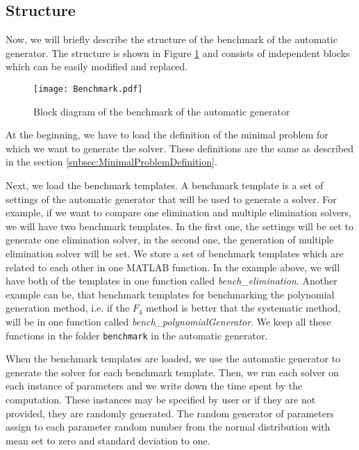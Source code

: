 \subsection{Structure}
Now, we will briefly describe the structure of the benchmark of the automatic generator. The structure is shown in Figure \ref{autogen:benchmark} and consists of independent blocks which can be easily modified and replaced.

\begin{figure}[ht]
  \centering
  \vspace{0.5cm}
  \texttt{[image: Benchmark.pdf]}
  \vspace{0.5cm}
  \caption{Block diagram of the benchmark of the automatic generator}
  \label{autogen:benchmark}
\end{figure}

At the beginning, we have to load the definition of the minimal problem for which we want to generate the solver. These definitions are the same as described in the section \ref{subsec:MinimalProblemDefinition}.

Next, we load the benchmark templates. A benchmark template is a set of settings of the automatic generator that will be used to generate a solver. For example, if we want to compare one elimination and multiple elimination solvers, we will have two benchmark templates. In the first one, the settings will be set to generate one elimination solver, in the second one, the generation of multiple elimination solver will be set. We store a set of benchmark templates which are related to each other in one MATLAB function. In the example above, we will have both of the templates in one function called \textit{bench\_elimination}. Another example can be, that benchmark templates for benchmarking the polynomial generation method, i.e. if the $F_4$ method is better that the systematic method, will be in one function called \textit{bench\_polynomialGenerator}. We keep all these functions in the folder \texttt{benchmark} in the automatic generator.

When the benchmark templates are loaded, we use the automatic generator to generate the solver for each benchmark template. Then, we run each solver on each instance of parameters and we write down the time spent by the computation. These instances may be specified by user or if they are not provided, they are randomly generated. The random generator of parameters assign to each parameter random number from the normal distribution with mean set to zero and standard deviation to one.


